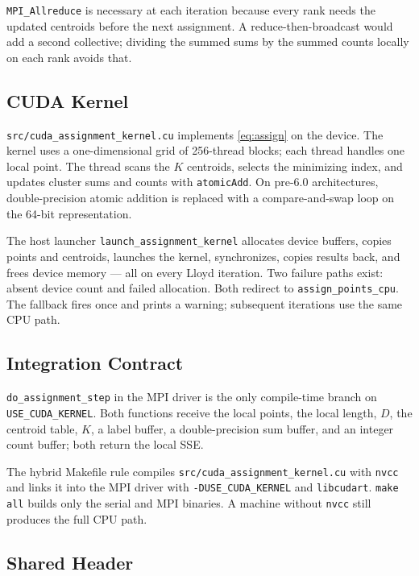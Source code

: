 \documentclass[12pt,a4paper]{article}
\DeclareRobustCommand{\code}[1]{\texttt{#1}}
\DeclareRobustCommand{\file}[1]{\texttt{#1}}
\begin{document}
\code{MPI\_Allreduce} is necessary at each iteration because every rank needs the updated centroids before the next assignment. A reduce-then-broadcast would add a second collective; dividing the summed sums by the summed counts locally on each rank avoids that.

\subsection{CUDA Kernel}

\file{src/cuda\_assignment\_kernel.cu} implements \eqref{eq:assign} on the device. The kernel uses a one-dimensional grid of 256-thread blocks; each thread handles one local point. The thread scans the $K$ centroids, selects the minimizing index, and updates cluster sums and counts with \code{atomicAdd}. On pre-6.0 architectures, double-precision atomic addition is replaced with a compare-and-swap loop on the 64-bit representation.

The host launcher \code{launch\_assignment\_kernel} allocates device buffers, copies points and centroids, launches the kernel, synchronizes, copies results back, and frees device memory — all on every Lloyd iteration. Two failure paths exist: absent device count and failed allocation. Both redirect to \code{assign\_points\_cpu}. The fallback fires once and prints a warning; subsequent iterations use the same CPU path.

\subsection{Integration Contract}

\code{do\_assignment\_step} in the MPI driver is the only compile-time branch on \code{USE\_CUDA\_KERNEL}. Both functions receive the local points, the local length, $D$, the centroid table, $K$, a label buffer, a double-precision sum buffer, and an integer count buffer; both return the local SSE.

The hybrid Makefile rule compiles \file{src/cuda\_assignment\_kernel.cu} with \code{nvcc} and links it into the MPI driver with \code{-DUSE\_CUDA\_KERNEL} and \code{libcudart}. \code{make all} builds only the serial and MPI binaries. A machine without \code{nvcc} still produces the full CPU path.

\subsection{Shared Header}
\end{document}
